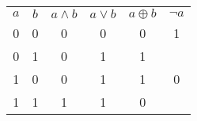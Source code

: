 \begin{center}
  \begin{tabular}{cccccc}
    $a$ & $b$ & $a \wedge b$ & $a \vee b$ & $a \oplus b$ & $\neg a$\\
    0 & 0 & 0 & 0 & 0 & 1 \\
    0 & 1 & 0 & 1 & 1 & \\
    1 & 0 & 0 & 1 & 1 & 0 \\
    1 & 1 & 1 & 1 & 0 & \\
  \end{tabular}
\end{center}
